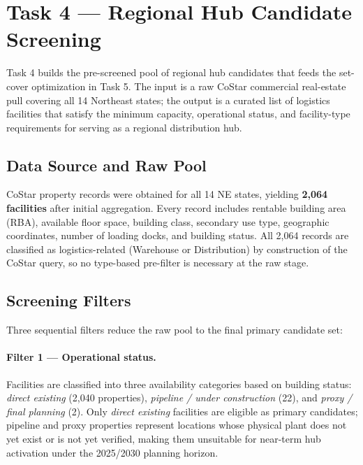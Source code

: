 
\section{Task 4 — Regional Hub Candidate Screening}

Task 4 builds the pre-screened pool of regional hub candidates that feeds the set-cover
optimization in Task 5. The input is a raw CoStar commercial real-estate pull covering all
14 Northeast states; the output is a curated list of logistics facilities that satisfy the
minimum capacity, operational status, and facility-type requirements for serving as a
regional distribution hub.

\subsection{Data Source and Raw Pool}

CoStar property records were obtained for all 14 NE states, yielding \textbf{2,064
facilities} after initial aggregation. Every record includes rentable building area (RBA),
available floor space, building class, secondary use type, geographic coordinates,
number of loading docks, and building status. All 2,064 records are classified as
logistics-related (Warehouse or Distribution) by construction of the CoStar query, so no
type-based pre-filter is necessary at the raw stage.

\subsection{Screening Filters}

Three sequential filters reduce the raw pool to the final primary candidate set:

\paragraph{Filter 1 — Operational status.}
Facilities are classified into three availability categories based on building status:
\textit{direct existing} (2,040 properties), \textit{pipeline / under construction} (22),
and \textit{proxy / final planning} (2). Only \textit{direct existing} facilities are
eligible as primary candidates; pipeline and proxy properties represent locations whose
physical plant does not yet exist or is not yet verified, making them unsuitable for
near-term hub activation under the 2025/2030 planning horizon.


